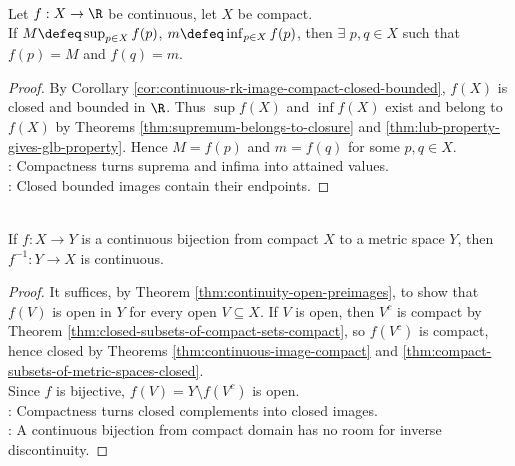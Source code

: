 \begin{theorem} \label{thm:extreme-value-theorem-compact} \\
Let $f:X\to\R$ be continuous, let $X$ be compact.\\
If $M\defeq\sup_{p\in X}f(p)$, $m\defeq\inf_{p\in X}f(p)$, then $\exists$ $p,q\in X$ such that $f(p)=M$ and $f(q)=m$.
\begin{proof}
By Corollary \ref{cor:continuous-rk-image-compact-closed-bounded}, $f(X)$ is closed and bounded in $\R$. Thus $\sup f(X)$ and $\inf f(X)$ exist and belong to $f(X)$ by Theorems \ref{thm:supremum-belongs-to-closure} and \ref{thm:lub-property-gives-glb-property}. Hence $M=f(p)$ and $m=f(q)$ for some $p,q\in X$.\\
: Compactness turns suprema and infima into attained values.\\
: Closed bounded images contain their endpoints.
\end{proof}
\end{theorem}

\begin{theorem} \label{thm:compact-bijection-has-continuous-inverse} \\
If $f:X\to Y$ is a continuous bijection from compact $X$ to a metric space $Y$, then $f^{-1}:Y\to X$ is continuous.
\begin{proof}
It suffices, by Theorem \ref{thm:continuity-open-preimages}, to show that $f(V)$ is open in $Y$ for every open $V\subseteq X$. If $V$ is open, then $V^c$ is compact by Theorem \ref{thm:closed-subsets-of-compact-sets-compact}, so $f(V^c)$ is compact, hence closed by Theorems \ref{thm:continuous-image-compact} and \ref{thm:compact-subsets-of-metric-spaces-closed}.\\
Since $f$ is bijective, $f(V)=Y\setminus f(V^c)$ is open.\\
: Compactness turns closed complements into closed images.\\
: A continuous bijection from compact domain has no room for inverse discontinuity.
\end{proof}
\end{theorem}

